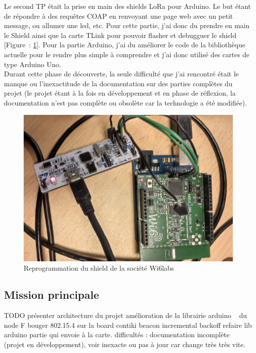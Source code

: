 \documentclass{article}
\begin{document}
Le second TP était la prise en main des shields LoRa pour Arduino. Le but étant de répondre à des requêtes COAP en renvoyant une page web avec un petit message, ou allumer une led, etc. Pour cette partie, j'ai donc du prendre en main le Shield ainsi que la carte TLink pour pouvoir flasher et debugguer le shield [Figure~: \ref{fig:shield}]. Pour la partie Arduino, j'ai du améliorer le code de la bibliothèque actuelle pour le rendre plus simple à comprendre et j'ai donc utilisé des cartes de type Arduino Uno.\\
Durant cette phase de découverte, la seule difficulté que j'ai rencontré était le manque ou l'inexactitude de la documentation sur des parties complètes du projet (le projet étant à la fois en développement et en phase de réflexion, la documentation n'est pas complète ou obsolète car la technologie a été modifiée).
\begin{figure}[h]
	\begin{center}
		\includegraphics[scale=0.1]{../res/img/shield.jpg}
		\caption{Reprogrammation du shield de la société Wi6labs}
		\label{fig:shield}
	\end{center}
\end{figure}
\subsection{Mission principale}
TODO présenter architecture du projet
amélioration de la librairie arduino ~ du node F
bouger 802.15.4 sur la board contiki
beacon incremental backoff
refaire lib arduino
partie qui envoie à la carte.
difficultés : documentation incomplète (projet en développement), voir inexacte ou pas à jour car change très très vite.
\end{document}
